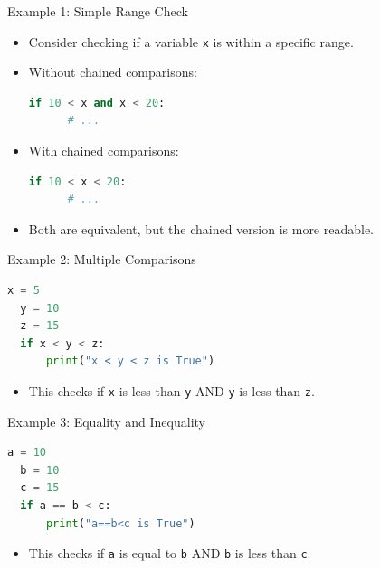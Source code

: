   \begin{frame}[fragile]{Example 1: Simple Range Check}
    \begin{itemize}
      \item Consider checking if a variable \texttt{x} is within a specific range.
      \item Without chained comparisons:
        \begin{lstlisting}[style=colorful, language=Python]
  if 10 < x and x < 20:
      # ...
        \end{lstlisting}
      \item With chained comparisons:
        \begin{lstlisting}[style=colorful, language=Python]
  if 10 < x < 20:
      # ...
        \end{lstlisting}
      \item Both are equivalent, but the chained version is more readable.
    \end{itemize}
  \end{frame}
  
  \begin{frame}[fragile]{Example 2: Multiple Comparisons}
    \begin{lstlisting}[style=colorful, language=Python]
  x = 5
  y = 10
  z = 15
  if x < y < z:
      print("x < y < z is True")
    \end{lstlisting}
    \begin{itemize}
      \item This checks if \texttt{x} is less than \texttt{y} AND \texttt{y} is less than \texttt{z}.
    \end{itemize}
  \end{frame}
  
  \begin{frame}[fragile]{Example 3: Equality and Inequality}
      \begin{lstlisting}[style=colorful, language=Python]
  a = 10
  b = 10
  c = 15
  if a == b < c:
      print("a==b<c is True")
      \end{lstlisting}
      \begin{itemize}
          \item This checks if \texttt{a} is equal to \texttt{b} AND \texttt{b} is less than \texttt{c}.
      \end{itemize}
  \end{frame}


